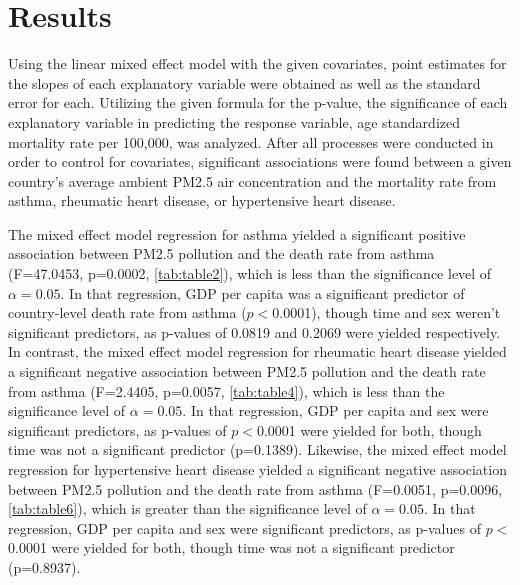 \documentclass[12pt, letterpaper, twoside]{article}\usepackage[]{graphicx}\usepackage[]{xcolor}
\begin{document}
\section*{Results}
Using the linear mixed effect model with the given covariates, point estimates
for the slopes of each explanatory variable were obtained as well as the standard
error for each. Utilizing the given formula for the p-value, the significance of
each explanatory variable in predicting the response variable, age standardized
mortality rate per 100,000, was analyzed. After all processes were
conducted in order to control for covariates, significant associations were
found between a given country's average ambient PM2.5 air concentration and
the mortality rate from asthma, rheumatic heart disease, or hypertensive heart
disease.\par

The mixed effect model regression for asthma yielded a significant
positive association between PM2.5 pollution and the death rate from asthma
(F=47.0453, p=0.0002, \autoref{tab:table2}), which is less
than the significance level of \begin{math}\alpha = 0.05\end{math}. In that
regression, GDP per capita was a significant predictor of country-level death rate
from asthma (\begin{math}p<\end{math}0.0001), though time and sex weren't
significant predictors, as p-values of 0.0819 and 0.2069 were yielded
respectively. In contrast, the mixed effect model regression for rheumatic heart
disease yielded a significant negative association between PM2.5 pollution and
the death rate from asthma (F=2.4405, p=0.0057, \autoref{tab:table4}), which is
less than the significance level of \begin{math}\alpha = 0.05\end{math}. In that
regression, GDP per capita and sex were significant predictors, as p-values of
\begin{math}p<\end{math}0.0001 were yielded for both, though time was not a
significant predictor (p=0.1389). Likewise, the mixed effect model regression for
hypertensive heart disease yielded a significant negative association between
PM2.5 pollution and the death rate from asthma (F=0.0051, p=0.0096,
\autoref{tab:table6}), which is greater than the significance level of
\begin{math}\alpha = 0.05\end{math}. In that regression, GDP per capita and sex
were significant predictors, as p-values of \begin{math}p<\end{math}0.0001 were
yielded for both, though time was not a significant predictor (p=0.8937).
\end{document}

